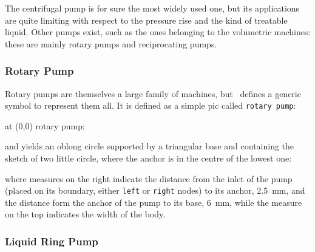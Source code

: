 \documentclass[12pt]{article}						%
\newcommand*{\ac}[1]{%
		\textsmaller{#1}%
	}
\newcommand*{\chpn}[1]{\texttt{#1}}				%
\newcommand*{\chpp}[1]{\texttt{#1}}				%
\newcommand*{\UNICHIM}{\ac{UNICHIM}}
\begin{document}
The centrifugal pump is for sure the most widely used one, but its applications
are quite limiting with respect to the pressure rise and the kind of treatable
liquid. Other pumps exist, such as the ones belonging to the volumetric machines:
these are mainly rotary pumps and reciprocating pumps.

\subsubsection{Rotary Pump}

Rotary pumps are themselves a large family of machines, but \UNICHIM\ defines
a generic symbol to represent them all. It is defined as a simple pic called
\chpp{rotary pump}:
\begin{chpcode}
	\pic at (0,0) {rotary pump};
\end{chpcode}
and yields an oblong circle supported by a triangular base and containing the
sketch of two little circle, where the anchor is in the centre of the lowest
one:
\begin{center}
\end{center}
where measures on the right indicate the distance from the inlet of the pump
(placed on its boundary, either \chpn{left} or \chpn{right} nodes) to its
anchor, \SI{2.5}{\mm}, and the distance form the anchor of the pump to its
base, \SI{6}{\mm}, while the measure on the top indicates the width of the body.

\subsubsection{Liquid Ring Pump}
\end{document}
